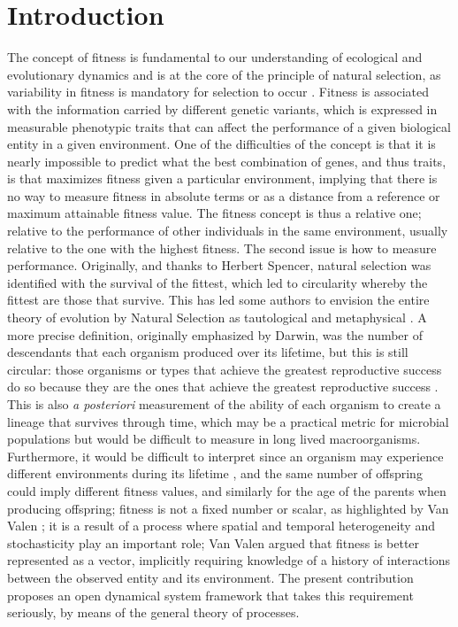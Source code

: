 \documentclass[12pt]{article}
\begin{document}
\section{Introduction}



The concept of fitness is fundamental to our understanding of ecological and evolutionary dynamics and is at the core of the principle of natural selection, as variability in fitness is mandatory for selection to occur \citep{orr2009fitness, wadgymar2024defining}. Fitness is associated with the information carried by different genetic variants, which is expressed in measurable phenotypic traits that can affect the performance of a given biological entity in a given environment. One of the difficulties of the concept is that it is nearly impossible to predict what the best combination of genes, and thus traits, is that maximizes fitness given a particular environment, implying that there is no way to measure fitness in absolute terms or as a distance from a reference or maximum attainable fitness value. The fitness concept is thus a relative one; relative to the performance of other individuals in the same environment, usually relative to the one with the highest fitness. The second issue is how to measure performance. Originally, and thanks to Herbert Spencer, natural selection was identified with the survival of the fittest, which led to circularity whereby the fittest are those that survive. This has led some authors to envision the entire theory of evolution by Natural Selection as tautological and metaphysical \cite{popper1978natural, manser1965concept}.  A more precise definition, originally emphasized by Darwin, was the number of descendants that each organism produced over its lifetime, but this is still circular: those organisms or types that achieve the greatest reproductive success do so because they are the ones that achieve the greatest reproductive success \citep{brandon1978adaptation}. This is also \textit{a posteriori} measurement of the ability of each organism to create a lineage that survives through time, which may be a practical metric for microbial populations but would be difficult to measure in long lived macroorganisms. Furthermore, it would be difficult to interpret since an organism may experience different environments during its lifetime \cite{jops2023life}, and the same number of offspring could imply different fitness values, and similarly for the age of the parents when producing offspring; fitness is not a fixed number or scalar, as highlighted by Van Valen \citep{VanValen}; it is a result of a process where spatial and temporal heterogeneity and stochasticity play an important role; Van Valen \citep{VanValen} argued that fitness is better represented as a vector, implicitly requiring knowledge of a history of interactions between the observed entity and its environment. The present contribution proposes an open dynamical system framework that takes this requirement seriously, by means of the general theory of processes.
\end{document}
